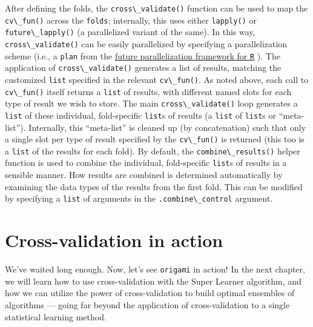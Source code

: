 \documentclass[
  12pt, krantz2,
]{krantz}
\newcommand{\passthrough}[1]{#1}
\newcommand{\1}{\mathbbm{1}}
\theoremstyle{definition}
\theoremstyle{definition}
\theoremstyle{definition}
\theoremstyle{definition}
\theoremstyle{remark}
\begin{document}
After defining the folds, the \passthrough{\lstinline!cross\_validate()!} function can be used to map the
\passthrough{\lstinline!cv\_fun()!} across the \passthrough{\lstinline!folds!}; internally, this uses either \passthrough{\lstinline!lapply()!} or
\passthrough{\lstinline!future\_lapply()!} (a parallelized variant of the same). In this way,
\passthrough{\lstinline!cross\_validate()!} can be easily parallelized by specifying a parallelization
scheme (i.e., a \passthrough{\lstinline!plan!} from the \href{https://Cran.R-project.org/package=future}{future parallelization framework for
\passthrough{\lstinline!R!}} \citep{bengtsson2021unifying}). The
application of \passthrough{\lstinline!cross\_validate()!} generates a list of results, matching the
customized \passthrough{\lstinline!list!} specified in the relevant \passthrough{\lstinline!cv\_fun()!}. As noted above, each
call to \passthrough{\lstinline!cv\_fun()!} itself returns a \passthrough{\lstinline!list!} of results, with different named
slots for each type of result we wish to store. The main \passthrough{\lstinline!cross\_validate()!}
loop generates a \passthrough{\lstinline!list!} of these individual, fold-specific \passthrough{\lstinline!list!}s of results (a
\passthrough{\lstinline!list!} of \passthrough{\lstinline!list!}s or ``meta-list''). Internally, this ``meta-list'' is cleaned up
(by concatenation) such that only a single slot per type of result specified by
the \passthrough{\lstinline!cv\_fun()!} is returned (this too is a \passthrough{\lstinline!list!} of the results for each fold).
By default, the \passthrough{\lstinline!combine\_results()!} helper function is used to combine the
individual, fold-specific \passthrough{\lstinline!list!}s of results in a sensible manner. How results
are combined is determined automatically by examining the data types of the
results from the first fold. This can be modified by specifying a \passthrough{\lstinline!list!} of
arguments in the \passthrough{\lstinline!.combine\_control!} argument.

\hypertarget{cross-validation-in-action}{%
\section{Cross-validation in action}\label{cross-validation-in-action}}

We've waited long enough. Now, let's see \passthrough{\lstinline!origami!} in action! In the next
chapter, we will learn how to use cross-validation with the Super Learner
algorithm, and how we can utilize the power of cross-validation to build optimal
ensembles of algorithms --- going far beyond the application of cross-validation
to a single statistical learning method.
\end{document}
